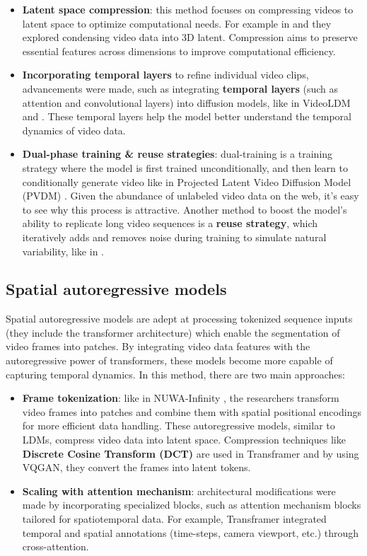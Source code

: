 \begin{itemize}
    \item \textbf{Latent space compression}: this method focuses on compressing videos to latent space to optimize computational needs. For example in \cite{zeng2024make} and \cite{gu2023reuse} they explored condensing video data into 3D latent. Compression aims to preserve essential features across dimensions to improve computational efficiency.
    \item \textbf{Incorporating temporal layers} to refine individual video clips, advancements were made, such as integrating \textbf{temporal layers} (such as attention and convolutional layers) into diffusion models, like in VideoLDM \cite{video_ldm} and \cite{gu2023reuse}. These temporal layers help the model better understand the temporal dynamics of video data.
    \item \textbf{Dual-phase training \& reuse strategies}: dual-training is a training strategy where the model is first trained unconditionally, and then learn to conditionally generate video like in Projected Latent Video Diffusion Model (PVDM) \cite{pvdm}. Given the abundance of unlabeled video data on the web, it's easy to see why this process is attractive. Another method to boost the model's ability to replicate long video sequences is a \textbf{reuse strategy}, which iteratively adds and removes noise during training to simulate natural variability, like in \cite{gu2023reuse}.
\end{itemize}

\subsection*{Spatial autoregressive models}

Spatial autoregressive models are adept at processing tokenized sequence inputs (they include the transformer architecture) which enable the segmentation of video frames into patches. By integrating video data features with the autoregressive power of transformers, these models become more capable of capturing temporal dynamics. In this method, there are two main approaches:

\begin{itemize}
    \item \textbf{Frame tokenization}: like in NUWA-Infinity \cite{nuwa_infinity}, the researchers transform video frames into patches and combine them with spatial positional encodings for more efficient data handling. These autoregressive models, similar to LDMs, compress video data into latent space. Compression techniques like \textbf{Discrete Cosine Transform (DCT)} are used in Transframer \cite{transframer} and by using VQGAN, they convert the frames into latent tokens.
    \item \textbf{Scaling with attention mechanism}: architectural modifications were made by incorporating specialized blocks, such as attention mechanism blocks tailored for spatiotemporal data. For example, Transframer \cite{transframer} integrated temporal and spatial annotations (time-steps, camera viewport, etc.) through cross-attention.
\end{itemize}

